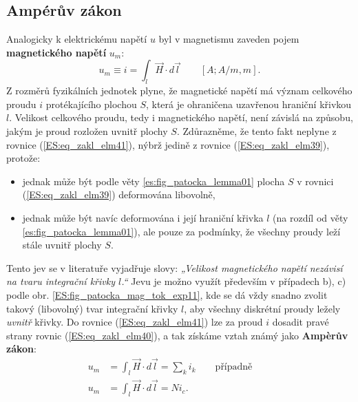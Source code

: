       \subsection{Ampérův zákon}
        Analogicky k elektrickému napětí \(u\) byl v magnetismu zaveden pojem \textbf{magnetického 
        napětí} \(u_m\):
        \begin{equation}\label{ES:eq_zakl_elm41}
          u_m \equiv i = \int_l \vec{H}\cdot d\vec{l} \qquad [A; A/m, m].
        \end{equation} 
        Z rozměrů fyzikálních jednotek plyne, že magnetické napětí má význam celkového proudu \(i\) 
        protékajícího plochou \(S\), která je ohraničena uzavřenou hraniční křivkou \(l\). Velikost 
        celkového proudu, tedy i magnetického napětí, není závislá na způsobu, jakým je proud 
        rozložen uvnitř plochy \(S\). Zdůrazněme, že tento fakt neplyne z rovnice 
        (\ref{ES:eq_zakl_elm41}), nýbrž jedině z rovnice (\ref{ES:eq_zakl_elm39}), protože:
        \begin{itemize}         
          \item jednak může být podle věty \ref{es:fig_patocka_lemma01} plocha \(S\) v rovnici 
                (\ref{ES:eq_zakl_elm39}) deformována libovolně,
          \item jednak může být navíc deformována i její hraniční křivka \(l\) (na rozdíl od věty 
                \ref{es:fig_patocka_lemma01}), ale pouze za podmínky, že všechny proudy leží stále 
                uvnitř plochy \(S\).
        \end{itemize}
        
        Tento jev se v literatuře vyjadřuje slovy: \emph{„Velikost magnetického napětí nezávisí na 
        tvaru integrační křivky \(l\).“} Jevu je možno využít především v případech b), c) podle 
        obr. \ref{ES:fig_patocka_mag_tok_exp11}, kde se dá vždy snadno zvolit takový (libovolný) 
        tvar integrační křivky \(l\), aby všechny diskrétní proudy ležely \emph{uvnitř} křivky. Do 
        rovnice (\ref{ES:eq_zakl_elm41}) lze za proud \(i\) dosadit pravé strany rovnic 
        (\ref{ES:eq_zakl_elm40}), a tak získáme vztah známý jako \textbf{Ampèrův zákon}:
        \begin{align}
          u_m &= \int_l \vec{H}\cdot d\vec{l} =\sum_k i_k 
          \qquad\text{případně}\qquad                                \nonumber \\
          u_m &= \int_l \vec{H}\cdot d\vec{l} =Ni_c.                 \label{ES:eq_zakl_elm42}
        \end{align}
     

